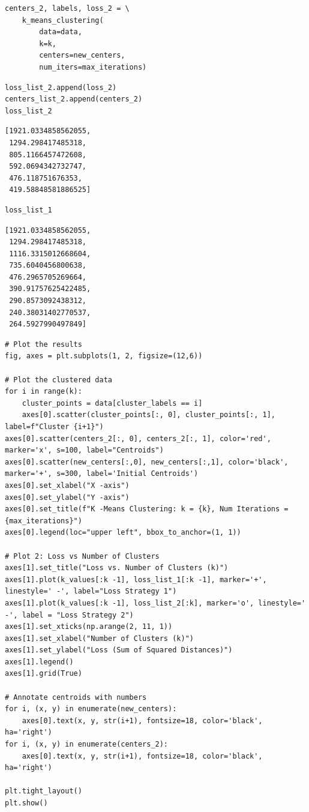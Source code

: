 \begin{verbatim}
centers_2, labels, loss_2 = \
    k_means_clustering(
        data=data,
        k=k,
        centers=new_centers,
        num_iters=max_iterations)
\end{verbatim}

\begin{verbatim}
loss_list_2.append(loss_2)
centers_list_2.append(centers_2)
loss_list_2
\end{verbatim}

\begin{verbatim}
[1921.0334858562055,
 1294.298417485318,
 805.1166457472608,
 592.0694342732747,
 476.118751676353,
 419.58848581886525]
\end{verbatim}

\begin{verbatim}
loss_list_1
\end{verbatim}

\begin{verbatim}
[1921.0334858562055,
 1294.298417485318,
 1116.3315012668604,
 735.6040456800638,
 476.2965705269664,
 390.91757625422485,
 290.8573092438312,
 240.38031402770537,
 264.5927990497849]
\end{verbatim}

\begin{verbatim}
# Plot the results
fig, axes = plt.subplots(1, 2, figsize=(12,6))

# Plot the clustered data
for i in range(k):
    cluster_points = data[cluster_labels == i]
    axes[0].scatter(cluster_points[:, 0], cluster_points[:, 1], label=f"Cluster {i+1}")
axes[0].scatter(centers_2[:, 0], centers_2[:, 1], color='red', marker='x', s=100, label="Centroids")
axes[0].scatter(new_centers[:,0], new_centers[:,1], color='black', marker='+', s=300, label='Initial Centroids')
axes[0].set_xlabel("X -axis")
axes[0].set_ylabel("Y -axis")
axes[0].set_title(f"K -Means Clustering: k = {k}, Num Iterations = {max_iterations}")
axes[0].legend(loc="upper left", bbox_to_anchor=(1, 1))

# Plot 2: Loss vs Number of Clusters
axes[1].set_title("Loss vs. Number of Clusters (k)")
axes[1].plot(k_values[:k -1], loss_list_1[:k -1], marker='+', linestyle=' -', label="Loss Strategy 1")
axes[1].plot(k_values[:k -1], loss_list_2[:k], marker='o', linestyle=' -', label = "Loss Strategy 2")
axes[1].set_xticks(np.arange(2, 11, 1))
axes[1].set_xlabel("Number of Clusters (k)")
axes[1].set_ylabel("Loss (Sum of Squared Distances)")
axes[1].legend()
axes[1].grid(True)

# Annotate centroids with numbers
for i, (x, y) in enumerate(new_centers):
    axes[0].text(x, y, str(i+1), fontsize=18, color='black', ha='right')
for i, (x, y) in enumerate(centers_2):
    axes[0].text(x, y, str(i+1), fontsize=18, color='black', ha='right')

plt.tight_layout()
plt.show()
\end{verbatim}

